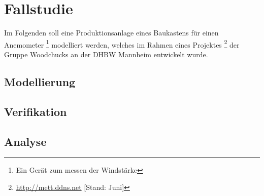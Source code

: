 \section{Fallstudie}
Im Folgenden soll eine Produktionsanlage eines Baukastens für einen
Anemometer \footnote{Ein Gerät zum messen der Windstärke} modelliert werden, welches im Rahmen eines Projektes \footnote{\url{http://mett.ddns.net} [Stand: Juni]}  der Gruppe Woodchucks an der DHBW Mannheim entwickelt wurde.
\subsection{Modellierung}

\subsection{Verifikation}

\subsection{Analyse}

